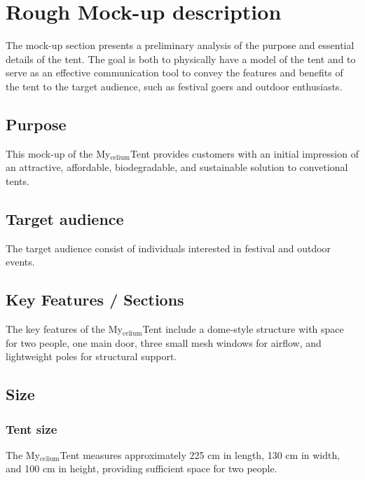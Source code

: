 \documentclass{article}
\begin{document}
\newpage
\section{Rough Mock-up description}
The mock-up section presents a preliminary analysis of the purpose and essential details
of the tent. The goal is both to physically have a model of the tent and to serve as an
effective communication tool to convey the features and benefits of the tent to the target
audience, such as festival goers and outdoor enthusiasts.

\subsection{Purpose}
This mock-up of the My$_{\text{celium}}$Tent provides customers with an initial
impression of an attractive, affordable, biodegradable, and sustainable
solution to convetional tents.

\subsection{Target audience}
The target audience consist of individuals interested in festival and
outdoor events.

\subsection{Key Features / Sections}
The key features of the My$_{\text{celium}}$Tent include a dome-style structure
with space for two people, one main door, three small mesh windows for
airflow, and lightweight poles for structural support.

\subsection{Size}
\subsubsection{Tent size}
The My$_{\text{celium}}$Tent measures approximately 225 cm in length, 130 cm in width,
and 100 cm in height, providing sufficient space for two people.
\end{document}
